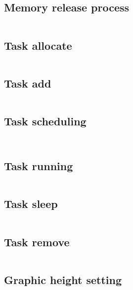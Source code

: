 \documentclass{swfcthesis}
\begin{document}
\subsection{Memory release process}
\label{sec:memory-rele-proc}
\inputminted[tabsize=2, firstline=88, lastline=158,
linenos=true]{c}{../../src/kernel/memory.c}

\subsection{Task allocate}
\label{sec:task-allocate}
\inputminted[tabsize=2, firstline=115, lastline=143,
linenos=true]{c}{../../src/kernel/mtask.c}


\subsection{Task add}
\label{sec:task-add}
\inputminted[tabsize=2, firstline=14, lastline=21,
linenos=true]{c}{../../src/kernel/mtask.c}

\subsection{Task scheduling}
\label{sec:task-scheduling}
\inputminted[tabsize=2, firstline=186, lastline=205,
linenos=true]{c}{../../src/kernel/mtask.c}
\inputminted[tabsize=2, firstline=49, lastline=63,
linenos=true]{c}{../../src/kernel/mtask.c}


\subsection{Task running}
\label{sec:task-running}
\inputminted[tabsize=2, firstline=146, lastline=165,
linenos=true]{c}{../../src/kernel/mtask.c}

\subsection{Task sleep}
\label{sec:task-sleep-1}
\inputminted[tabsize=2, firstline=167, lastline=184,
linenos=true]{c}{../../src/kernel/mtask.c}

\subsection{Task remove}
\label{sec:task-remove}
\inputminted[tabsize=2, firstline=23, lastline=47,
linenos=true]{c}{../../src/kernel/mtask.c}

\subsection{Graphic height setting}
\label{sec:graph-height-sett}
\inputminted[tabsize=2, firstline=250, lastline=322,
linenos=true]{c}{../../src/kernel/sheet.c}
\end{document}
